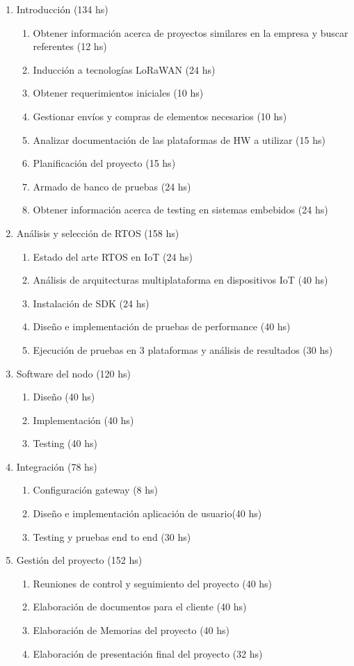 \documentclass[11pt]{charter}
\begin{document}
\begin{enumerate}
\item Introducción (134 hs)
	\begin{enumerate}
	\item Obtener información acerca de proyectos similares en la empresa y buscar referentes (12 hs)
	\item Inducción a tecnologías LoRaWAN (24 hs)
	\item Obtener requerimientos iniciales (10 hs)
	\item Gestionar envíos y compras de elementos necesarios (10 hs)
	\item Analizar documentación de las plataformas de HW a utilizar (15 hs)
	\item Planificación del proyecto (15 hs)
	\item Armado de banco de pruebas (24 hs)
	\item Obtener información acerca de testing en sistemas embebidos (24 hs)
	\end{enumerate}
\item Análisis y selección de RTOS (158 hs)
	\begin{enumerate}
	\item Estado del arte RTOS en IoT (24 hs)
	\item Análisis de arquitecturas multiplataforma en dispositivos IoT (40 hs)
	\item Instalación de SDK (24 hs)
	\item Diseño e implementación de pruebas de performance (40 hs)
	\item Ejecución de pruebas en 3 plataformas y análisis de resultados (30 hs)
	\end{enumerate}	
\item Software del nodo (120 hs)
	\begin{enumerate}
	\item Diseño (40 hs)
	\item Implementación (40 hs)
	\item Testing (40 hs)
	\end{enumerate}
\item Integración (78 hs)
	\begin{enumerate}
	\item Configuración gateway (8 hs)
	\item Diseño e implementación aplicación de usuario(40 hs)
	\item Testing y pruebas end to end (30 hs)
	\end{enumerate}
\item Gestión del proyecto (152 hs)
	\begin{enumerate}
	\item Reuniones de control y seguimiento del proyecto (40 hs)
	\item Elaboración de documentos para el cliente (40 hs)
	\item Elaboración de Memorias del proyecto (40 hs)
	\item Elaboración de presentación final del proyecto (32 hs)
	\end{enumerate}
\end{enumerate}
\end{document}
